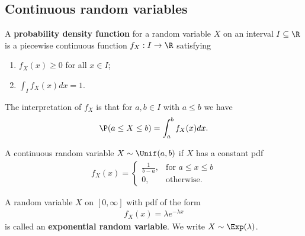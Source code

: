 \documentclass{article}
\begin{document}
\subsection{Continuous random variables}
\begin{definition}
	A \textbf{probability density function} for a random variable $X$ on an
	interval $I\subseteq\R$ is a piecewise continuous function $f_X:I\to\R$ satisfying
	\begin{enumerate}
		\item $f_X(x) \geq 0$ for all $x\in I$;
		\item $\int_I f_X(x) dx =1$.
	\end{enumerate}
	The interpretation of $f_X$ is that for $a,b\in I$ with $a\leq b$ we have
	\begin{align*}
		\P(a\leq X\leq b)=\int_a^b f_X(x)dx.
	\end{align*}
\end{definition}
\begin{definition}
	A continuous random variable $X\sim\Unif(a,b)$ if $X$ has a constant pdf
	\begin{align*}
		f_X(x) = \begin{cases}
			         \frac{1}{b-a}, & \text{for }a\leq x\leq b \\
			         0,             & \text{otherwise.}
		         \end{cases}
	\end{align*}
\end{definition}
\begin{definition}
	A random variable $X$ on $[0,\infty]$ with pdf of the form
	\begin{align*}
		f_X(x) = \lambda e^{-\lambda x}
	\end{align*}
	is called an \textbf{exponential random variable}.
	We write $X\sim\Exp(\lambda)$.
\end{definition}
\end{document}
